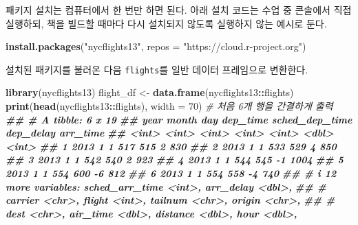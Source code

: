 \documentclass[
]{book}
\newenvironment{Shaded}{\begin{snugshade}}{\end{snugshade}}
\newcommand{\AttributeTok}[1]{\textcolor[rgb]{0.13,0.29,0.53}{#1}}
\newcommand{\CommentTok}[1]{\textcolor[rgb]{0.56,0.35,0.01}{\textit{#1}}}
\newcommand{\DecValTok}[1]{\textcolor[rgb]{0.00,0.00,0.81}{#1}}
\newcommand{\DocumentationTok}[1]{\textcolor[rgb]{0.56,0.35,0.01}{\textbf{\textit{#1}}}}
\newcommand{\FunctionTok}[1]{\textcolor[rgb]{0.13,0.29,0.53}{\textbf{#1}}}
\newcommand{\NormalTok}[1]{#1}
\newcommand{\OtherTok}[1]{\textcolor[rgb]{0.56,0.35,0.01}{#1}}
\newcommand{\SpecialCharTok}[1]{\textcolor[rgb]{0.81,0.36,0.00}{\textbf{#1}}}
\newcommand{\StringTok}[1]{\textcolor[rgb]{0.31,0.60,0.02}{#1}}
\begin{document}
패키지 설치는 컴퓨터에서 한 번만 하면 된다. 아래 설치 코드는 수업 중 콘솔에서 직접 실행하되, 책을 빌드할 때마다 다시 설치되지 않도록 실행하지 않는 예시로 둔다.

\begin{Shaded}
\begin{Highlighting}[]
\FunctionTok{install.packages}\NormalTok{(}\StringTok{"nycflights13"}\NormalTok{, }\AttributeTok{repos =} \StringTok{"https://cloud.r{-}project.org"}\NormalTok{)}
\end{Highlighting}
\end{Shaded}

설치된 패키지를 불러온 다음 \texttt{flights}를 일반 데이터 프레임으로 변환한다.

\begin{Shaded}
\begin{Highlighting}[]
\FunctionTok{library}\NormalTok{(nycflights13)}
\NormalTok{flight\_df }\OtherTok{\textless{}{-}} \FunctionTok{data.frame}\NormalTok{(nycflights13}\SpecialCharTok{::}\NormalTok{flights)}
\FunctionTok{print}\NormalTok{(}\FunctionTok{head}\NormalTok{(nycflights13}\SpecialCharTok{::}\NormalTok{flights), }\AttributeTok{width =} \DecValTok{70}\NormalTok{) }\CommentTok{\# 처음 6개 행을 간결하게 출력}
\DocumentationTok{\#\# \# A tibble: 6 x 19}
\DocumentationTok{\#\#    year month   day dep\_time sched\_dep\_time dep\_delay arr\_time}
\DocumentationTok{\#\#   \textless{}int\textgreater{} \textless{}int\textgreater{} \textless{}int\textgreater{}    \textless{}int\textgreater{}          \textless{}int\textgreater{}     \textless{}dbl\textgreater{}    \textless{}int\textgreater{}}
\DocumentationTok{\#\# 1  2013     1     1      517            515         2      830}
\DocumentationTok{\#\# 2  2013     1     1      533            529         4      850}
\DocumentationTok{\#\# 3  2013     1     1      542            540         2      923}
\DocumentationTok{\#\# 4  2013     1     1      544            545        {-}1     1004}
\DocumentationTok{\#\# 5  2013     1     1      554            600        {-}6      812}
\DocumentationTok{\#\# 6  2013     1     1      554            558        {-}4      740}
\DocumentationTok{\#\# \# i 12 more variables: sched\_arr\_time \textless{}int\textgreater{}, arr\_delay \textless{}dbl\textgreater{},}
\DocumentationTok{\#\# \#   carrier \textless{}chr\textgreater{}, flight \textless{}int\textgreater{}, tailnum \textless{}chr\textgreater{}, origin \textless{}chr\textgreater{},}
\DocumentationTok{\#\# \#   dest \textless{}chr\textgreater{}, air\_time \textless{}dbl\textgreater{}, distance \textless{}dbl\textgreater{}, hour \textless{}dbl\textgreater{},}

\end{Highlighting}
\end{Shaded}
\end{document}
